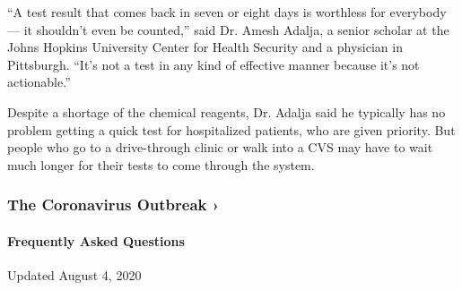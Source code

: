``A test result that comes back in seven or eight days is worthless for
everybody --- it shouldn't even be counted,'' said Dr. Amesh Adalja, a
senior scholar at the Johns Hopkins University Center for Health
Security and a physician in Pittsburgh. ``It's not a test in any kind of
effective manner because it's not actionable.''

Despite a shortage of the chemical reagents, Dr. Adalja said he
typically has no problem getting a quick test for hospitalized patients,
who are given priority. But people who go to a drive-through clinic or
walk into a CVS may have to wait much longer for their tests to come
through the system.

\href{https://www.nytimes3xbfgragh.onion/news-event/coronavirus?action=click\&pgtype=Article\&state=default\&region=MAIN_CONTENT_3\&context=storylines_faq}{}

\hypertarget{the-coronavirus-outbreak-}{%
\subsubsection{The Coronavirus Outbreak
›}\label{the-coronavirus-outbreak-}}

\hypertarget{frequently-asked-questions}{%
\paragraph{Frequently Asked
Questions}\label{frequently-asked-questions}}

Updated August 4, 2020

